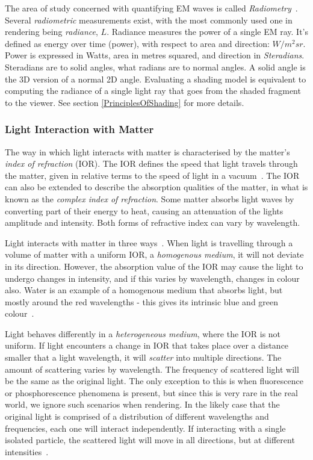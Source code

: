 The area of study concerned with quantifying EM waves is called \textit{Radiometry}~\cite{IntroToRadiometry}. Several \textit{radiometric} measurements exist, with the most commonly used one in rendering being \textit{radiance}, \begin{math}L\end{math}. Radiance measures the power of a single EM ray. It's defined as energy over time (power), with respect to area and direction: \begin{math}W/m^2sr\end{math}. Power is expressed in Watts, area in metres squared, and direction in \textit{Steradians}. Steradians are to solid angles, what radians are to normal angles. A solid angle is the 3D version of a normal 2D angle. Evaluating a shading model is equivalent to computing the radiance of a single light ray that goes from the shaded fragment to the viewer. See section \ref{PrinciplesOfShading} for more details.

\subsubsection{Light Interaction with Matter}

The way in which light interacts with matter is characterised by the matter's \textit{index of refraction} (IOR). The IOR defines the speed that light travels through the matter, given in relative terms to the speed of light in a vacuum~\cite{HowLightInteractsWithMatter}. The IOR can also be extended to describe the absorption qualities of the matter, in what is known as the \textit{complex index of refraction}. Some matter absorbs light waves by converting part of their energy to heat, causing an attenuation of the lights amplitude and intensity. Both forms of refractive index can vary by wavelength.

Light interacts with matter in three ways~\cite{HoffmanPBSBackground}. When light is travelling through a volume of matter with a uniform IOR, a \textit{homogenous medium}, it will not deviate in its direction. However, the absorption value of the IOR may cause the light to undergo changes in intensity, and if this varies by wavelength, changes in colour also. Water is an example of a homogenous medium that absorbs light, but mostly around the red wavelengths - this gives its intrinsic blue and green colour~\cite{HowLightInteractsWithMatter}.

Light behaves differently in a \textit{heterogeneous medium}, where the IOR is not uniform. If light encounters a change in IOR that takes place over a distance smaller that a light wavelength, it will \textit{scatter} into multiple directions. The amount of scattering varies by wavelength. The frequency of scattered light will be the same as the original light. The only exception to this is when fluorescence or phosphorescence phenomena is present, but since this is very rare in the real world, we ignore such scenarios when rendering. In the likely case that the original light is comprised of a distribution of different wavelengths and frequencies, each one will interact independently. If interacting with a single isolated particle, the scattered light will move in all directions, but at different intensities~\cite{RTR4}.

